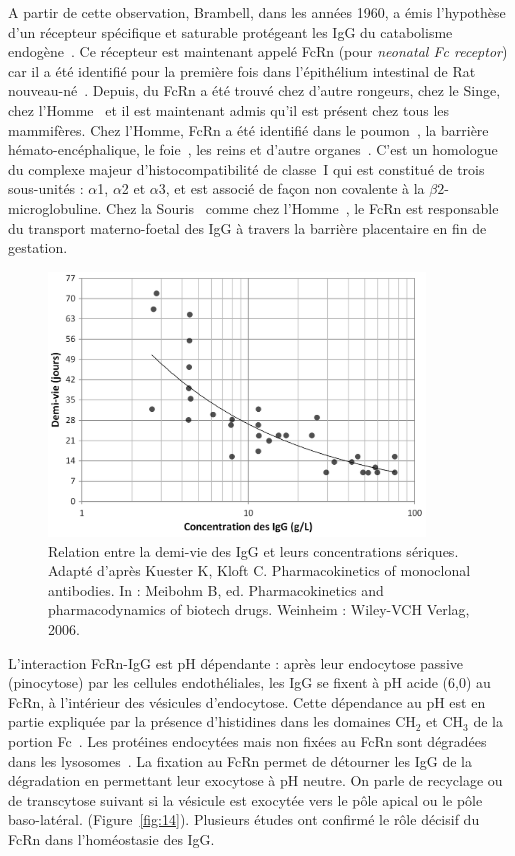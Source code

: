 A partir de cette observation, Brambell, dans les années 1960, a émis l'hypothèse d'un récepteur spécifique et saturable protégeant les IgG du catabolisme endogène~\citep{REF24}. Ce récepteur est maintenant appelé FcRn (pour \textit{neonatal Fc receptor}) car il a été identifié pour la première fois dans l'épithélium intestinal de Rat nouveau-né~\citep{REF25}. Depuis, du FcRn a été trouvé chez d'autre rongeurs, chez le Singe, chez l'Homme~\citep{REF26} et il est maintenant admis qu'il est présent chez tous les mammifères. Chez l'Homme, FcRn a été identifié dans le poumon~\citep{REF27}, la barrière hémato-encéphalique, le foie~\citep{REF28}, les reins et d'autre organes~\citep{REF29}. C'est un homologue du complexe majeur d'histocompatibilité de classe~I qui est constitué de trois sous-unités : $\alpha$1, $\alpha$2 et $\alpha$3, et est associé de façon non covalente à la $\beta 2$-microglobuline. Chez la Souris~\citep{REF30, REF31} comme chez l'Homme~\citep{REF32, REF33}, le FcRn est responsable du transport materno-foetal des IgG à travers la barrière placentaire en fin de gestation.

\begin{figure}[htbp]
	\centering
		\includegraphics[width=10cm]{figures/raster/Figure13_C_t12}
	\caption[Relation entre la demi-vie des IgG et leurs concentrations sériques.]{Relation entre la demi-vie des IgG et leurs concentrations sériques. Adapté d'après Kuester K, Kloft C. Pharmacokinetics of monoclonal antibodies. In : Meibohm B, ed. Pharmacokinetics and pharmacodynamics of biotech drugs. Weinheim : Wiley-VCH Verlag, 2006.}
	\label{fig:13}
\end{figure}

L'interaction FcRn-IgG est pH dépendante : après leur endocytose passive (pinocytose) par les cellules endothéliales, les IgG se fixent à pH acide (6,0) au FcRn, à l'intérieur des vésicules d'endocytose. Cette dépendance au pH est en partie expliquée par la présence d'histidines dans les domaines CH$_2$ et CH$_3$ de la portion Fc~\citep{REF34, REF35}. Les protéines endocytées mais non fixées au FcRn sont dégradées dans les lysosomes~\citep{REF36, REF37}. La fixation au FcRn permet de détourner les IgG de la dégradation en permettant leur exocytose à pH neutre. On parle de recyclage ou de transcytose suivant si la vésicule est exocytée vers le pôle apical ou le pôle baso-latéral. (Figure~\ref{fig:14}). Plusieurs études ont confirmé le rôle décisif du FcRn dans l'homéostasie des IgG.

